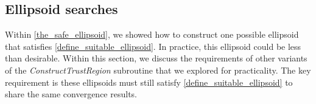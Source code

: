 \documentclass{article}
\begin{document}
%
%
%
%
%

% 

\subsection{Ellipsoid searches}

Within \cref{the_safe_ellipsoid}, we showed how to construct one possible ellipsoid that satisfies \cref{define_suitable_ellipsoid}.
In practice, this ellipsoid could be less than desirable.
Within this section, we discuss the requirements of other variants of the \emph{ConstructTrustRegion} subroutine that we explored for practicality.
The key requirement is these ellipsoids must still satisfy \cref{define_suitable_ellipsoid} to share the same convergence results.
\end{document}
